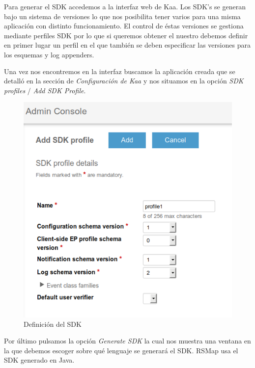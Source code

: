 \bigskip

Para generar el SDK accedemos a la interfaz web de Kaa. Los SDK's se generan bajo un sistema de versiones lo que nos posibilita tener varios para una misma aplicación con distinto funcionamiento. El control de éstas versiones se gestiona mediante perfiles SDK por lo que si queremos obtener el nuestro debemos definir en primer lugar un perfil en el que también se deben especificar las versiones para los esquemas y log appenders.

Una vez nos encontremos en la interfaz buscamos la aplicación creada que se detalló en la sección de \textit{Configuración de Kaa} y nos situamos en la opción \textit{SDK profiles} / \textit{Add SDK Profile}.


\begin{figure}[!ht]
  \begin{center}
    \includegraphics[scale=0.30]{../images/sdk/1.png}
		\caption{Definición del SDK}
    \label{fig:kaa}
	\end{center}
\end{figure}

\newpage

Por último pulsamos la opción \textit{Generate SDK} la cual nos muestra una ventana en la que debemos escoger sobre qué lenguaje se generará el SDK. RSMap usa el SDK generado en Java.


